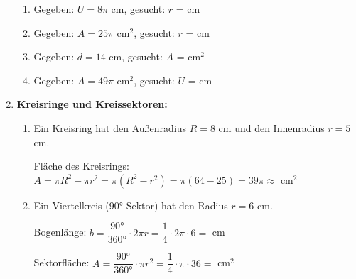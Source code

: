 \begin{enumerate}[label=\arabic*.]
    \begin{enumerate}[label=\alph*)]
        \item Gegeben: $U = 8\pi$ cm, gesucht: $r$ = \underline{\hspace{2cm}} cm
        \vspace{0.3cm}
        \item Gegeben: $A = 25\pi$ cm$^2$, gesucht: $r$ = \underline{\hspace{2cm}} cm
        \vspace{0.3cm}
        \item Gegeben: $d = 14$ cm, gesucht: $A$ = \underline{\hspace{2cm}} cm$^2$
        \vspace{0.3cm}
        \item Gegeben: $A = 49\pi$ cm$^2$, gesucht: $U$ = \underline{\hspace{2cm}} cm
    \end{enumerate}

    \vspace{1cm}

    \item \textbf{Kreisringe und Kreissektoren:}
    \vspace{0.5cm}

    \begin{enumerate}[label=\alph*)]
        \item Ein Kreisring hat den Außenradius $R = 8$ cm und den Innenradius $r = 5$ cm.
        \vspace{0.3cm}

        Fläche des Kreisrings: $A = \pi R^2 - \pi r^2 = \pi(R^2 - r^2) = \pi(64 - 25) = 39\pi \approx$ \underline{\hspace{2cm}} cm$^2$

        \vspace{0.5cm}
        \item Ein Viertelkreis (90°-Sektor) hat den Radius $r = 6$ cm.
        \vspace{0.3cm}

        Bogenlänge: $b = \dfrac{90°}{360°} \cdot 2\pi r = \dfrac{1}{4} \cdot 2\pi \cdot 6 =$ \underline{\hspace{2cm}} cm

        Sektorfläche: $A = \dfrac{90°}{360°} \cdot \pi r^2 = \dfrac{1}{4} \cdot \pi \cdot 36 =$ \underline{\hspace{2cm}} cm$^2$
    \end{enumerate}

\end{enumerate}